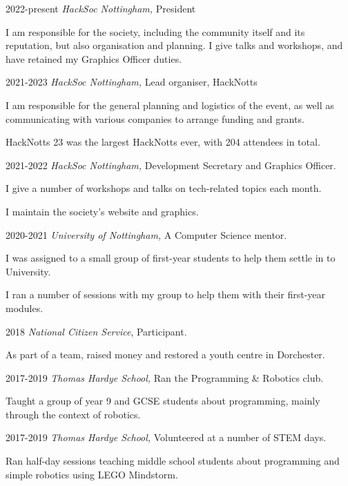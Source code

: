 \documentclass[12pt]{article}
\begin{document}
\begin{explist}
	\item[2022-present] \textit{HackSoc Nottingham,} President
	{\small \begin{explist}
		\item I am responsible for the society, including the community itself and its reputation, but also organisation and planning. I give talks and workshops, and have retained my Graphics Officer duties.
	\end{explist}}
	\item[2021-2023] \textit{HackSoc Nottingham,} Lead organiser, HackNotts
	{\small \begin{explist}
		\item I am responsible for the general planning and logistics of the event, as well as communicating with various companies to arrange funding and grants.
		\item HackNotts 23 was the largest HackNotts ever, with 204 attendees in total.
	\end{explist}}
	\item[2021-2022] \textit{HackSoc Nottingham,} Development Secretary and Graphics Officer.
	{\small \begin{explist}
		\item I give a number of workshops and talks on tech-related topics each month.
		\item I maintain the society's website and graphics.
	\end{explist}}
	\item[2020-2021] \textit{University of Nottingham,} A Computer Science mentor.
	{\small \begin{explist}
		\item I was assigned to a small group of first-year students to help them settle in to University.
		\item I ran a number of sessions with my group to help them with their first-year modules.
	\end{explist}}
	\item[2018] \textit{National Citizen Service}, Participant.
	{\small \begin{explist}
		\item As part of a team, raised money and restored a youth centre in Dorchester.
	\end{explist}}
	\item[2017-2019] \textit{Thomas Hardye School,} Ran the Programming \& Robotics club.
	{\small \begin{explist}
		\item Taught a group of year 9 and GCSE students about programming, mainly through the context of robotics.
	\end{explist}}
	\item[2017-2019] \textit{Thomas Hardye School,} Volunteered at a number of STEM days.
	{\small \begin{explist}
		\item Ran half-day sessions teaching middle school students about programming and simple robotics using LEGO Mindstorm.
	\end{explist}}
\end{explist}
\end{document}
